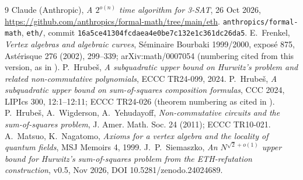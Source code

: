 \documentclass[11pt]{amsart}
\theoremstyle{remark}
\begin{document}
\begin{thebibliography}{9}
 Claude (Anthropic), \emph{A $2^{o(n)}$ time algorithm for 3-SAT}, 26 Oct 2026, \url{https://github.com/anthropics/formal-math/tree/main/eth}.
 \texttt{anthropics/formal-math}, \texttt{eth/}, commit \texttt{16a5ce41304fcdaea4e0be7c132e1c361dc26da5}.
 E.~Frenkel, \emph{Vertex algebras and algebraic curves}, S\'eminaire Bourbaki 1999/2000, expos\'e 875, Ast\'erisque 276 (2002), 299--339; arXiv:math/0007054 (numbering cited from this version, as in \cite{ETH}).
 P.~Hrube\v{s}, \emph{A subquadratic upper bound on Hurwitz's problem and related non-commutative polynomials}, ECCC TR24-099, 2024.
 P.~Hrube\v{s}, \emph{A subquadratic upper bound on sum-of-squares composition formulas}, CCC 2024, LIPIcs 300, 12:1--12:11; ECCC TR24-026 (theorem numbering as cited in \cite[App.~G]{ETH}).
 P.~Hrube\v{s}, A.~Wigderson, A.~Yehudayoff, \emph{Non-commutative circuits and the sum-of-squares problem}, J. Amer. Math. Soc. 24 (2011); ECCC TR10-021.
 A.~Matsuo, K.~Nagatomo, \emph{Axioms for a vertex algebra and the locality of quantum fields}, MSJ Memoirs 4, 1999.
 J.~P.~Siemaszko, \emph{An $N^{\sqrt2+o(1)}$ upper bound for Hurwitz's sum-of-squares problem from the ETH-refutation construction}, v0.5, Nov 2026, DOI 10.5281/zenodo.24024689.
\end{thebibliography}
\end{document}
